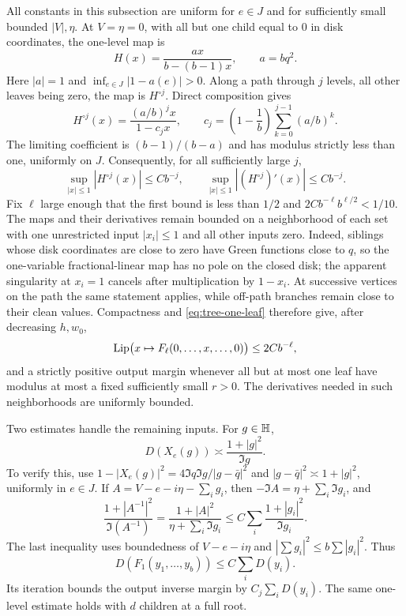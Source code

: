 All constants in this subsection are uniform for $e\in J$ and for
sufficiently small bounded $|V|,\eta$.  At $V=\eta=0$, with all but
one child equal to $0$ in disk coordinates, the one-level map is
\[
 H(x)=\frac{ax}{b-(b-1)x},\qquad a=bq^2.
\]
Here $|a|=1$ and $\inf_{e\in J}|1-a(e)|>0$.  Along a path through
$j$ levels, all other leaves being zero, the map is $H^{\circ j}$.
Direct composition gives
\[
 H^{\circ j}(x)=\frac{(a/b)^j x}{1-c_jx},\qquad
 c_j=\left(1-\frac1b\right)\sum_{k=0}^{j-1}(a/b)^k.
\]
The limiting coefficient is $(b-1)/(b-a)$ and has modulus strictly
less than one, uniformly on $J$.  Consequently, for all sufficiently
large $j$,
\begin{equation}\label{eq:tree-one-leaf}
 \sup_{|x|\le1}|H^{\circ j}(x)|\le Cb^{-j},\qquad
 \sup_{|x|\le1}|(H^{\circ j})'(x)|\le Cb^{-j}.
\end{equation}
Fix $\ell$ large enough that the first bound is less than $1/2$ and
$2Cb^{-\ell}b^{\ell/2}<1/10$.  The maps and their derivatives remain
bounded on a neighborhood of each set with one unrestricted input
$|x_i|\le1$ and all other inputs zero.  Indeed, siblings whose disk
coordinates are close to zero have Green functions close to $q$, so the one-variable fractional-linear
map has no pole on the closed disk; the apparent singularity at
$x_i=1$ cancels after multiplication by $1-x_i$.  At successive
vertices on the path the same statement applies, while off-path
branches remain close to their clean values.  Compactness and
\eqref{eq:tree-one-leaf} therefore give, after decreasing $h,w_0$,
\begin{equation}\label{eq:tree-one-leaf-perturbed}
 \operatorname{Lip}\bigl(x\mapsto F_\ell(0,\ldots,x,\ldots,0)\bigr)
 \le 2Cb^{-\ell},
\end{equation}
and a strictly positive output margin whenever all but at most one
leaf have modulus at most a fixed sufficiently small $r>0$.
The derivatives needed in such neighborhoods are uniformly bounded.

Two estimates handle the remaining inputs.  For $g\in\mathbb H$,
\begin{equation}\label{eq:tree-hyperbolic-comparison}
 D(X_e(g))\asymp\frac{1+|g|^2}{\Im g}.
\end{equation}
To verify this, use
$1-|X_e(g)|^2=4\Im q\Im g/|g-\bar q|^2$ and
$|g-\bar q|^2\asymp1+|g|^2$, uniformly in $e\in J$.
If $A=V-e-i\eta-\sum_i g_i$, then
$-\Im A=\eta+\sum_i\Im g_i$, and
\[
 \frac{1+|A^{-1}|^2}{\Im(A^{-1})}
 =\frac{1+|A|^2}{\eta+\sum_i\Im g_i}
 \le C\sum_i\frac{1+|g_i|^2}{\Im g_i}.
\]
The last inequality uses boundedness of $V-e-i\eta$ and
$|\sum g_i|^2\le b\sum|g_i|^2$.  Thus
\begin{equation}\label{eq:tree-margin-bound}
 D(F_1(y_1,\ldots,y_b))\le C\sum_iD(y_i).
\end{equation}
Its iteration bounds the output inverse margin by $C_j\sum_iD(y_i)$.
The same one-level estimate holds with $d$ children at a full root.

